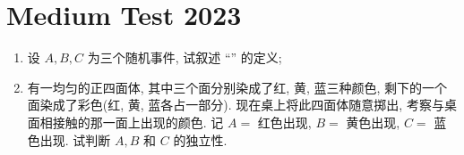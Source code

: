 \documentclass[../main.tex]{subfiles}
\begin{document}
\ifSubfilesClassLoaded{

    
}{}

\chapter{ Medium Test 2023 }
\begin{exercise}{}{}
\begin{enumerate}
    \item 设 $A, B, C$ 为三个随机事件, 试叙述 “” 的定义;
    \item 有一均匀的正四面体, 其中三个面分别染成了红, 黄, 蓝三种颜色, 剩下的一个面染成了彩色(红, 黄, 蓝各占一部分). 现在桌上将此四面体随意掷出, 考察与桌面相接触的那一面上出现的颜色. 记 $A = $ 红色出现, $B = $ 黄色出现, $C = $ 蓝色出现. 试判断 $A, B$ 和 $C$ 的独立性.
\end{enumerate}
\end{exercise}
\end{document}
